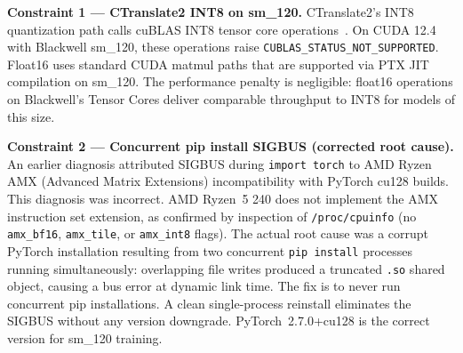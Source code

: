 \documentclass[conference]{IEEEtran}
\begin{document}
\begin{table}[htbp]
\caption{Hardware Constraints and Solutions.}
\label{tab:constraints}
\centering
{}
\end{table}

\textbf{Constraint 1 --- CTranslate2 INT8 on sm\_120.}
CTranslate2's INT8 quantization path calls cuBLAS INT8 tensor core operations~\cite{dettmers2022llmint8}.
On CUDA 12.4 with Blackwell sm\_120, these operations raise
\texttt{CUBLAS\_STATUS\_NOT\_SUPPORTED}. Float16 uses standard CUDA matmul
paths that are supported via PTX JIT compilation on sm\_120.
The performance penalty is negligible: float16 operations on Blackwell's
Tensor Cores deliver comparable throughput to INT8 for models of this size.

\textbf{Constraint 2 --- Concurrent pip install SIGBUS (corrected root cause).}
An earlier diagnosis attributed SIGBUS during \texttt{import torch} to AMD Ryzen AMX
(Advanced Matrix Extensions) incompatibility with PyTorch cu128 builds.
This diagnosis was incorrect. AMD Ryzen~5 240 does not implement the AMX instruction
set extension, as confirmed by inspection of \texttt{/proc/cpuinfo} (no \texttt{amx\_bf16},
\texttt{amx\_tile}, or \texttt{amx\_int8} flags).
The actual root cause was a corrupt PyTorch installation resulting from two concurrent
\texttt{pip install} processes running simultaneously: overlapping file writes produced
a truncated \texttt{.so} shared object, causing a bus error at dynamic link time.
The fix is to never run concurrent pip installations. A clean single-process reinstall
eliminates the SIGBUS without any version downgrade. PyTorch~2.7.0+cu128 is the
correct version for sm\_120 training.
\end{document}
